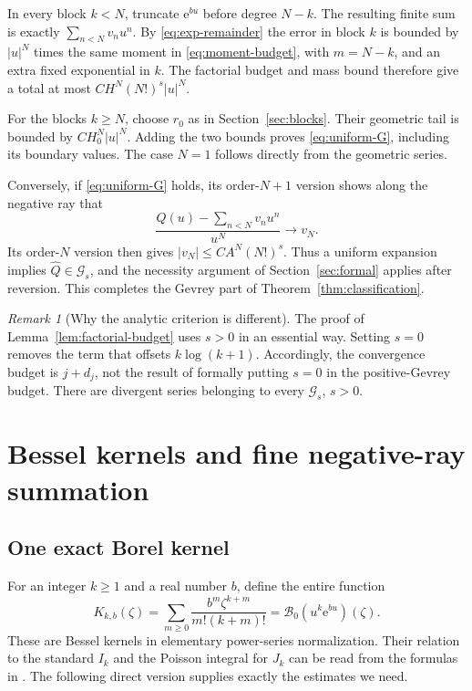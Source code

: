 \documentclass[11pt,a4paper]{article}
\numberwithin{equation}{section}
\theoremstyle{definition}
\theoremstyle{remark}
\newtheorem{remark}[theorem]{Remark}
\theoremstyle{definition}
\newcommand{\Q}{\widehat Q}
\newcommand{\Gev}{\mathcal G}
\newcommand{\B}{\mathcal B_0}
\newcommand{\e}{\mathrm e}
\begin{document}
In every block $k<N$, truncate $\e^{bu}$ before degree $N-k$.
The resulting finite sum is exactly $\sum_{n<N}v_nu^n$. By
\eqref{eq:exp-remainder} the error in block $k$ is bounded by $|u|^N$
times the same moment in \eqref{eq:moment-budget}, with $m=N-k$,
and an extra fixed exponential in $k$. The factorial budget and mass
bound therefore give a total at most $C H^N(N!)^s|u|^N$.

For the blocks $k\ge N$, choose $r_0$ as in Section~\ref{sec:blocks}.
Their geometric tail is bounded by $C H_0^N|u|^N$. Adding the two
bounds proves \eqref{eq:uniform-G}, including its boundary values.
The case $N=1$ follows directly from the geometric series.

Conversely, if \eqref{eq:uniform-G} holds, its order-$N+1$ version
shows along the negative ray that
\[
 \frac{Q(u)-\sum_{n<N}v_nu^n}{u^N}\longrightarrow v_N.
\]
Its order-$N$ version then gives $|v_N|\le CA^N(N!)^s$.
Thus a uniform expansion implies $\Q\in\Gev_s$, and the necessity
argument of Section~\ref{sec:formal} applies after reversion.
This completes the Gevrey part of Theorem~\ref{thm:classification}.

\begin{remark}[Why the analytic criterion is different]
The proof of Lemma~\ref{lem:factorial-budget} uses $s>0$ in an essential
way. Setting $s=0$ removes the term that offsets $k\log(k+1)$.
Accordingly, the convergence budget is $j+d_j$, not the result of
formally putting $s=0$ in the positive-Gevrey budget. There are divergent
series belonging to every $\Gev_s$, $s>0$.
\end{remark}

\section{Bessel kernels and fine negative-ray summation}
\label{sec:summation}

\subsection{One exact Borel kernel}
For an integer $k\ge1$ and a real number $b$, define the entire function
\begin{equation}
 K_{k,b}(\zeta)=\sum_{m\ge0}
       \frac{b^m\zeta^{k+m}}{m!(k+m)!}
       =\B(u^k\e^{bu})(\zeta).
 \label{eq:bessel-kernel}
\end{equation}
These are Bessel kernels in elementary power-series normalization.
Their relation to the standard $I_k$ and the Poisson integral for $J_k$
can be read from the formulas in \cite{dlmf}. The following direct
version supplies exactly the estimates we need.
\end{document}
